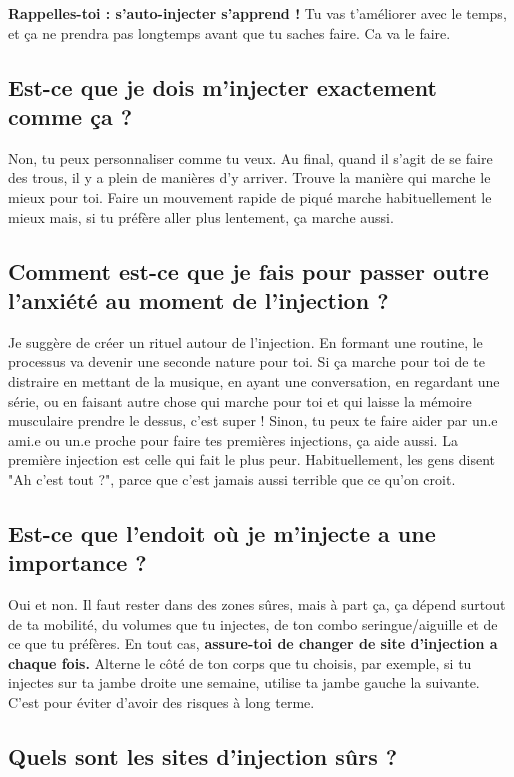 \documentclass{article}
\begin{document}
\textbf{Rappelles-toi : s'auto-injecter s'apprend ! } Tu vas t'améliorer avec le temps, et ça ne prendra pas longtemps avant que tu saches faire. Ca va le faire.

\subsection{Est-ce que je dois m'injecter exactement comme ça ?}

Non, tu peux personnaliser comme tu veux. Au final, quand il s'agit de se faire des trous, il y a plein de manières d'y arriver. Trouve la manière qui marche le mieux pour toi. Faire un mouvement rapide de piqué marche habituellement le mieux mais, si tu préfère aller plus lentement, ça marche aussi. 

\subsection{Comment est-ce que je fais pour passer outre l'anxiété au moment de l'injection ?}

Je suggère de créer un rituel autour de l'injection. En formant une routine, le processus va devenir une seconde nature pour toi. Si ça marche pour toi de te distraire en mettant de la musique, en ayant une conversation, en regardant une série, ou en faisant autre chose qui marche pour toi et qui laisse la mémoire musculaire prendre le dessus, c'est super ! Sinon, tu peux te faire aider par un.e ami.e ou un.e proche pour faire tes premières injections, ça aide aussi. La première injection est celle qui fait le plus peur. Habituellement, les gens disent "Ah c'est tout ?", parce que c'est jamais aussi terrible que ce qu'on croit.

\subsection{Est-ce que l'endoit où je m'injecte a une importance ?}

Oui et non. Il faut rester dans des zones sûres, mais à part ça, ça dépend surtout de ta mobilité, du volumes que tu injectes, de ton combo seringue/aiguille et de ce que tu préfères. En tout cas, \textbf{assure-toi de changer de site d'injection a chaque fois.} Alterne le côté de ton corps que tu choisis, par exemple, si tu injectes sur ta jambe droite une semaine, utilise ta jambe gauche la suivante. C'est pour éviter d'avoir des risques à long terme.

\subsection{Quels sont les sites d'injection sûrs ?}\label{5-5}
\end{document}

